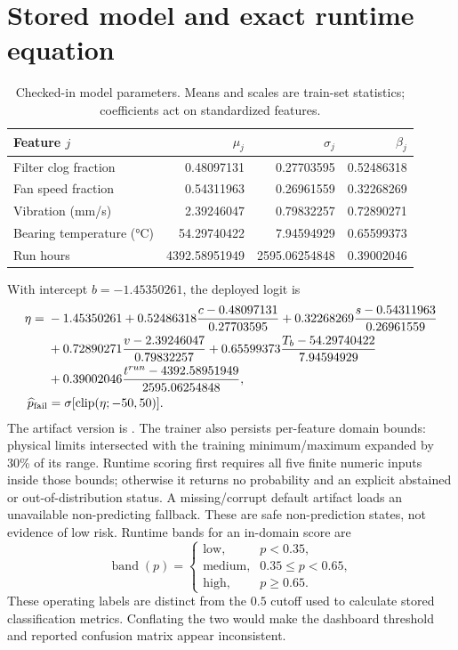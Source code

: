 \section{Stored model and exact runtime equation}
\begin{table}[H]
\centering
\caption{Checked-in model parameters. Means and scales are train-set statistics; coefficients act on standardized features.}
\label{tab:modelparams}
\begin{tabular}{lrrr}
\toprule
Feature $j$ & $\mu_j$ & $\sigma_j$ & $\beta_j$\\
\midrule
Filter clog fraction & 0.48097131 & 0.27703595 & 0.52486318\\
Fan speed fraction & 0.54311963 & 0.26961559 & 0.32268269\\
Vibration (mm/s) & 2.39246047 & 0.79832257 & 0.72890271\\
Bearing temperature (\si{\celsius}) & 54.29740422 & 7.94594929 & 0.65599373\\
Run hours & 4392.58951949 & 2595.06254848 & 0.39002046\\
\bottomrule
\end{tabular}
\end{table}
With intercept $b=-1.45350261$, the deployed logit is
\begin{align}
\eta={}&-1.45350261+0.52486318\frac{c-0.48097131}{0.27703595}
+0.32268269\frac{s-0.54311963}{0.26961559}\\
&+0.72890271\frac{v-2.39246047}{0.79832257}
+0.65599373\frac{T_b-54.29740422}{7.94594929}\\
&+0.39002046\frac{t^{run}-4392.58951949}{2595.06254848},\\
\widehat p_{\mathrm{fail}}&=\sigma[\operatorname{clip}(\eta;-50,50)].
\label{eq:risk}
\end{align}
The artifact version is . The trainer also persists per-feature domain bounds: physical limits intersected with the training minimum/maximum expanded by 30\% of its range. Runtime scoring first requires all five finite numeric inputs inside those bounds; otherwise it returns no probability and an explicit abstained or out-of-distribution status. A missing/corrupt default artifact loads an unavailable non-predicting fallback. These are safe non-prediction states, not evidence of low risk. Runtime bands for an in-domain score are
\begin{equation}
\operatorname{band}(p)=\begin{cases}\text{low},&p<0.35,\\\text{medium},&0.35\le p<0.65,\\\text{high},&p\ge0.65.\end{cases}
\end{equation}
These operating labels are distinct from the $0.5$ cutoff used to calculate stored classification metrics. Conflating the two would make the dashboard threshold and reported confusion matrix appear inconsistent.

